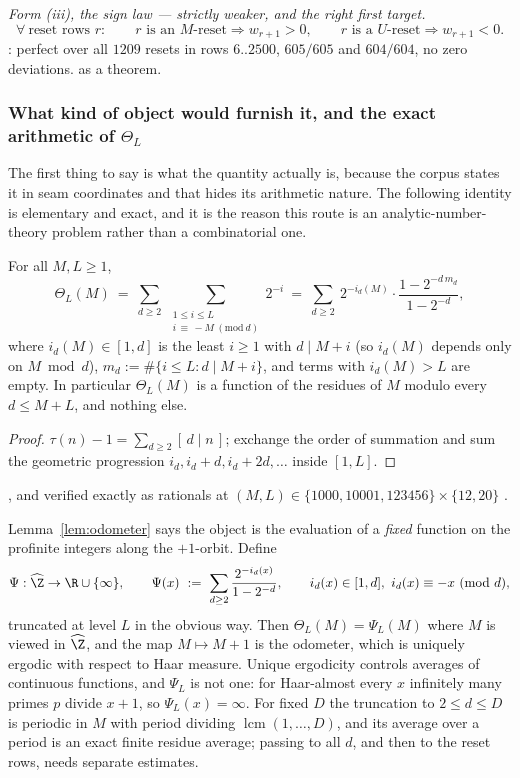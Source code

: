 \emph{Form (iii), the sign law --- strictly weaker, and the right first target.}
\[
\forall\ \text{reset rows } r:\qquad
r \text{ is an } M\text{-reset}\Rightarrow w_{r+1}>0,
\qquad
r \text{ is a } U\text{-reset}\Rightarrow w_{r+1}<0 .
\]
: perfect over all $1209$ resets in rows $6..2500$, $605/605$ and $604/604$, no zero
deviations.  as a theorem.

\subsubsection*{What kind of object would furnish it, and the exact arithmetic of $\Theta_L$}

The first thing to say is what the quantity actually is, because the corpus states it in seam
coordinates and that hides its arithmetic nature. The following identity is elementary and
exact, and it is the reason this route is an analytic-number-theory problem rather than a
combinatorial one.

\begin{lem}
\label{lem:odometer}
For all $M,L\ge 1$,
\[
\Theta_L(M)\ =\ \sum_{d\ge 2}\ \sum_{\substack{1\le i\le L\\ i\,\equiv\,-M\ (\mathrm{mod}\ d)}} 2^{-i}
\ =\ \sum_{d\ge 2}\ 2^{-i_d(M)}\cdot\frac{1-2^{-d\,m_d}}{1-2^{-d}},
\]
where $i_d(M)\in[1,d]$ is the least $i\ge1$ with $d\mid M+i$ (so $i_d(M)$ depends only on
$M \bmod d$), $m_d := \#\{i\le L: d\mid M+i\}$, and terms with $i_d(M)>L$ are empty. In
particular $\Theta_L(M)$ is a function of the residues of $M$ modulo every $d\le M+L$, and
nothing else.
\end{lem}
\begin{proof}
$\tau(n)-1=\sum_{d\ge2}[\,d\mid n\,]$; exchange the order of summation and sum the geometric
progression $i_d, i_d+d, i_d+2d,\dots$ inside $[1,L]$.
\end{proof}
, and verified exactly as rationals at $(M,L)\in\{1000,10001,123456\}\times\{12,20\}$
.

Lemma~\ref{lem:odometer} says the object is the evaluation of a \emph{fixed} function on the
profinite integers along the $+1$-orbit. Define
\[
\Psi:\widehat{\Z}\to\R\cup\{\infty\},\qquad
\Psi(x)\ :=\ \sum_{d\ge2}\frac{2^{-i_d(x)}}{1-2^{-d}},\qquad i_d(x)\in[1,d],\ i_d(x)\equiv -x\ (\mathrm{mod}\ d),
\]
truncated at level $L$ in the obvious way. Then $\Theta_L(M)=\Psi_L(M)$ where $M$ is viewed in
$\widehat{\Z}$, and the map $M\mapsto M+1$ is the odometer, which is uniquely ergodic with respect
to Haar measure. Unique ergodicity controls averages of continuous functions, and $\Psi_L$ is not
one: for Haar-almost every $x$ infinitely many primes $p$ divide $x+1$, so $\Psi_L(x)=\infty$.
For fixed $D$ the truncation to $2\le d\le D$ is periodic in $M$ with period dividing
$\operatorname{lcm}(1,\ldots,D)$, and its average over a period is an exact finite residue average;
passing to all $d$, and then to the reset rows, needs separate estimates.

